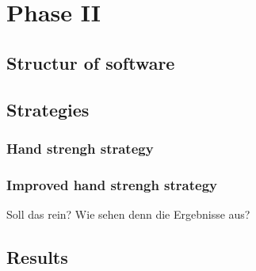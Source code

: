 \chapter{Phase II}

\section{Structur of software}

\section{Strategies}
\subsection{Hand strengh strategy}
\subsection{Improved hand strengh strategy}
Soll das rein? Wie sehen denn die Ergebnisse aus?

\section{Results}
